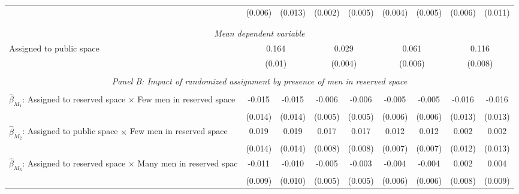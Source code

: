 \begin{tabular}{l*{8}{c}}
                    &     (0.006)         &     (0.013)         &     (0.002)         &     (0.005)         &     (0.004)         &     (0.005)         &     (0.006)         &     (0.011)         \\
\\[-1.8ex] \hline \\[-1.8ex] \multicolumn{9}{c}{\textit{Mean dependent variable}} \\ Assigned to public space & \multicolumn{2}{c}{0.164} & \multicolumn{2}{c}{0.029} & \multicolumn{2}{c}{0.061} & \multicolumn{2}{c}{0.116} \\ \, & \multicolumn{2}{c}{(0.01)} & \multicolumn{2}{c}{(0.004)} & \multicolumn{2}{c}{(0.006)} & \multicolumn{2}{c}{(0.008)} \\ 

\hline \\[-1ex] \multicolumn{9}{c}{\textit{Panel B: Impact of randomized assignment by presence of men in reserved space}} \\\\[-1ex]
$\hat\beta_{M_1}$: Assigned to reserved space $\times$ Few men in reserved space&      -0.015         &      -0.015         &      -0.006         &      -0.006         &      -0.005         &      -0.005         &      -0.016         &      -0.016         \\
                    &     (0.014)         &     (0.014)         &     (0.005)         &     (0.005)         &     (0.006)         &     (0.006)         &     (0.013)         &     (0.013)         \\
[1em]
$\hat\beta_{M_2}$: Assigned to public space $\times$ Few men in reserved space&       0.019         &       0.019         &       0.017\sym{**} &       0.017\sym{**} &       0.012\sym{*}  &       0.012\sym{*}  &       0.002         &       0.002         \\
                    &     (0.014)         &     (0.014)         &     (0.008)         &     (0.008)         &     (0.007)         &     (0.007)         &     (0.012)         &     (0.013)         \\
[1em]
$\hat\beta_{M_3}$: Assigned to reserved space $\times$ Many men in reserved spac&      -0.011         &      -0.010         &      -0.005         &      -0.003         &      -0.004         &      -0.004         &       0.002         &       0.004         \\
                    &     (0.009)         &     (0.010)         &     (0.005)         &     (0.005)         &     (0.006)         &     (0.006)         &     (0.008)         &     (0.009)         \\

\end{tabular}
